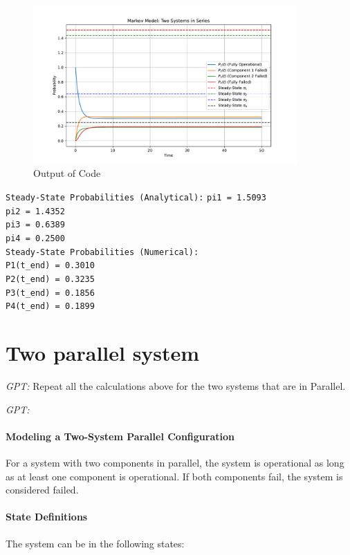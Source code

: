 \documentclass[a4paper,12pt]{article}
\begin{document}
\begin{figure}[h!]
	\centering
	\includegraphics[width=0.9\textwidth]{Images/Figure_2.pdf} 
	\caption{Output of Code}
	\label{fig:Output of Code2}
\end{figure}


\texttt{Steady-State Probabilities (Analytical):}
\texttt{pi1 = 1.5093}\\
\texttt{pi2 = 1.4352}\\
\texttt{pi3 = 0.6389}\\
\texttt{pi4 = 0.2500}\\
\texttt{Steady-State Probabilities (Numerical):}\\
\texttt{P1(t\_end) = 0.3010}\\
\texttt{P2(t\_end) = 0.3235}\\
\texttt{P3(t\_end) = 0.1856}\\
\texttt{P4(t\_end) = 0.1899}\\




\section{Two parallel system}
\begin{questionbox}
	\textit{GPT:} 
	Repeat all the calculations above for the two systems that are in Parallel.
\end{questionbox}



\begin{answerbox}
	\textit{GPT: }
	
	\paragraph{Modeling a Two-System Parallel Configuration}
	For a system with two components in parallel, the system is operational as long as at least one component is operational. If both components fail, the system is considered failed.
	
	\paragraph{State Definitions}
	The system can be in the following states:
\end{answerbox}
\end{document}
